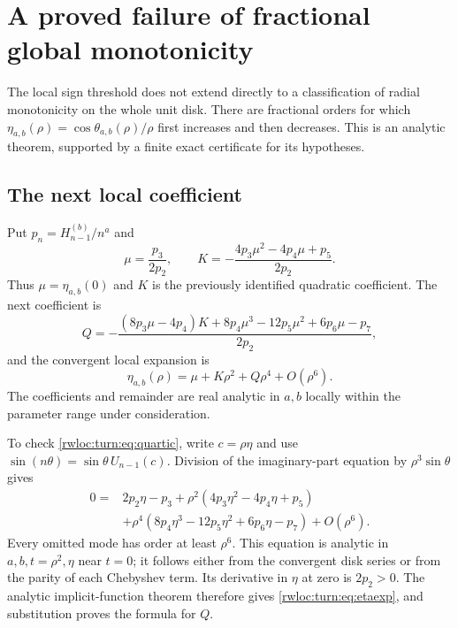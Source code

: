 \section{A proved failure of fractional global monotonicity}
\label{rwloc:turn:sec:main}

The local sign threshold does not extend directly to a classification of
radial monotonicity on the whole unit disk. There are fractional orders
for which $\eta_{a,b}(\rho)=\cos\theta_{a,b}(\rho)/\rho$ first
increases and then decreases. This is an analytic theorem, supported by
a finite exact certificate for its hypotheses.

\subsection{The next local coefficient}

Put $p_n=H_{n-1}^{(b)}/n^a$ and
\[
 \mu=\frac{p_3}{2p_2},\qquad
 K=-\frac{4p_3\mu^2-4p_4\mu+p_5}{2p_2}.
\]
Thus $\mu=\eta_{a,b}(0)$ and $K$ is the previously identified
quadratic coefficient. The next coefficient is
\begin{equation}\label{rwloc:turn:eq:quartic}
 Q=-\frac{(8p_3\mu-4p_4)K
              +8p_4\mu^3-12p_5\mu^2+6p_6\mu-p_7}{2p_2},
\end{equation}
and the convergent local expansion is
\begin{equation}\label{rwloc:turn:eq:etaexp}
 \eta_{a,b}(\rho)=\mu+K\rho^2+Q\rho^4+O(\rho^6).
\end{equation}
The coefficients and remainder are real analytic in $a,b$ locally
within the parameter range under consideration.

To check \eqref{rwloc:turn:eq:quartic}, write $c=\rho\eta$ and use
$\sin(n\theta)=\sin\theta\,U_{n-1}(c)$. Division of the
imaginary-part equation by $\rho^3\sin\theta$ gives
\begin{align*}
 0={}&2p_2\eta-p_3
   +\rho^2(4p_3\eta^2-4p_4\eta+p_5)\\
   &+\rho^4(8p_4\eta^3-12p_5\eta^2+6p_6\eta-p_7)
   +O(\rho^6).
\end{align*}
Every omitted mode has order at least $\rho^6$. This equation is
analytic in $a,b,t=\rho^2,\eta$ near $t=0$; it follows either
from the convergent disk series or from the parity of each Chebyshev
term. Its derivative in $\eta$ at zero is $2p_2>0$. The analytic
implicit-function theorem therefore gives \eqref{rwloc:turn:eq:etaexp},
and substitution proves the formula for $Q$.

